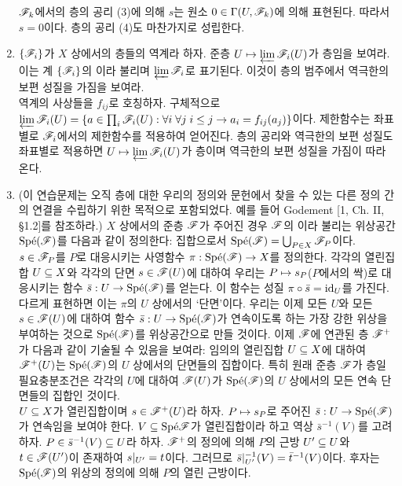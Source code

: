 \begin{enumerate}[label=\tb{1.\arabic*.},itemindent=0mm,itemsep=4mm]
	$\mathscr{F}_k$에서의 층의 공리 (3)에 의해 $s$는 원소 $0\in\Gamma(U,\mathscr{F}_k)$에 의해 표현된다. 따라서 $s=0$이다.
	층의 공리 (4)도 마찬가지로 성립한다.
	\item {} $\{\mathscr{F}_i\}$가 $X$ 상에서의 층들의 역계라 하자.
	준층 $U\mapsto\varprojlim\mathscr{F}_i(U)$가 층임을 보여라. 이는 계 $\{\mathscr{F}_i\}$의 이라 불리며
	$\varprojlim\mathscr{F}_i$로 표기된다. 이것이 층의 범주에서 역극한의 보편 성질을 가짐을 보여라.\\
	\sol 역계의 사상들을 $f_{ij}$로 호칭하자.
	구체적으로 $\varprojlim\mathscr{F}_i(U)=\{a\in\prod_i\mathscr{F}_i(U):\forall i\;\forall j\;i\le j\rightarrow a_i=f_{ij}(a_j)\}$이다.
	제한함수는 좌표별로 $\mathscr{F}_i$에서의 제한함수를 적용하여 얻어진다.
	층의 공리와 역극한의 보편 성질도 좌표별로 적용하면 $U\mapsto\varprojlim\mathscr{F}_i(U)$가 층이며 역극한의 보편 성질을 가짐이 따라온다.
	\item {}
	(이 연습문제는 오직 층에 대한 우리의 정의와 문헌에서 찾을 수 있는 다른 정의 간의 연결을 수립하기 위한 목적으로 포함되었다.
	예를 들어 Godement [1, Ch. II, \S 1.2]를 참조하라.)
	$X$ 상에서의 준층 $\mathscr{F}$가 주어진 경우 $\mathscr{F}$의 이라 불리는
	위상공간 $\text{Sp\'e}(\mathscr{F})$를 다음과 같이 정의한다: 집합으로서 $\text{Sp\'e}(\mathscr{F})=\bigcup_{P\in X}\mathscr{F}_P$이다.
	$s\in\mathscr{F}_P$를 $P$로 대응시키는 사영함수 $\pi:\text{Sp\'e}(\mathscr{F})\rightarrow X$를 정의한다.
	각각의 열린집합 $U\subseteq X$와 각각의 단면 $s\in\mathscr{F}(U)$에 대하여 우리는 $P\mapsto s_P$($P$에서의 싹)로 대응시키는
	함수 $\bar s:U\rightarrow\text{Sp\'e}(\mathscr{F})$를 얻는다.
	이 함수는 성질 $\pi\circ\bar s=\mathrm{id}_U$를 가진다. 다르게 표현하면 이는 $\pi$의 $U$ 상에서의 `단면'이다.
	우리는 이제 모든 $U$와 모든 $s\in\mathscr{F}(U)$에 대하여 함수 $\bar s:U\rightarrow\text{Sp\'e}(\mathscr{F})$가 연속이도록 하는
	가장 강한 위상을 부여하는 것으로 $\text{Sp\'e}(\mathscr{F})$를 위상공간으로 만들 것이다.
	이제 $\mathscr{F}$에 연관된 층 $\mathscr{F}^+$가 다음과 같이 기술될 수 있음을 보여라:
	임의의 열린집합 $U\subseteq X$에 대하여 $\mathscr{F}^+(U)$는 $\text{Sp\'e}(\mathscr{F})$의 $U$ 상에서의  단면들의 집합이다.
	특히 원래 준층 $\mathscr{F}$가 층일 필요충분조건은 각각의 $U$에 대하여 $\mathscr{F}(U)$가
	$\text{Sp\'e}(\mathscr{F})$의 $U$ 상에서의 모든 연속 단면들의 집합인 것이다.\\
	\sol $U\subseteq X$가 열린집합이며 $s\in\mathscr{F}^+(U)$라 하자. $P\mapsto s_P$로 주어진 $\bar s:U\rightarrow\text{Sp\'e}(\mathscr{F})$가 연속임을 보여야 한다.
	$V\subseteq\text{Sp\'e}{\mathscr{F}}$가 열린집합이라 하고 역상 $\bar s^{-1}(V)$를 고려하자. $P\in\bar s^{-1}(V)\subseteq U$라 하자.
	$\mathscr{F}^+$의 정의에 의해 $P$의 근방 $U'\subseteq U$와 $t\in\mathscr{F}(U')$이 존재하여 $s|_{U'}=t$이다.
	그러므로 $\bar s|_{U'}^{-1}(V)=\bar t^{-1}(V)$이다. 후자는 $\text{Sp\'e}(\mathscr{F})$의 위상의 정의에 의해 $P$의 열린 근방이다.

\end{enumerate}

